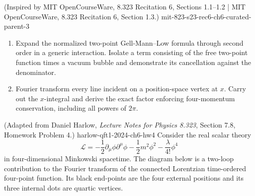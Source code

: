 \begin{enumerate}
  {(Inspired by MIT OpenCourseWare, 8.323 Recitation 6, Sections 1.1--1.2 | MIT OpenCourseWare, 8.323 Recitation 6, Section 1.3.)}
  {mit-823-s23-rec6-ch6-curated-parent-3}
\begin{enumerate}
\item
Expand the normalized two-point Gell-Mann--Low formula through second
order in a generic interaction.  Isolate a term consisting of the free
two-point function times a vacuum bubble and demonstrate its cancellation
against the denominator.
\item
Fourier transform every line incident on a position-space vertex at
\(x\).  Carry out the \(x\)-integral and derive the exact factor enforcing
four-momentum conservation, including all powers of \(2\pi\).
\end{enumerate}

  {(Adapted from Daniel Harlow, \emph{Lecture Notes for Physics 8.323},
  Section 7.8, Homework Problem 4.)}
  {harlow-qft1-2024-ch6-hw4}
Consider the real scalar theory
\[
 \mathcal L=-\frac12\partial_\mu\phi\partial^\mu\phi
 -\frac12m^2\phi^2-\frac{\lambda}{4!}\phi^4
\]
in four-dimensional Minkowski spacetime.  The diagram below is a two-loop
contribution to the Fourier transform of the connected Lorentzian
time-ordered four-point function.  Its black end-points are the four
external positions and its three internal dots are quartic vertices.

\begin{center}
\end{center}


\end{enumerate}
